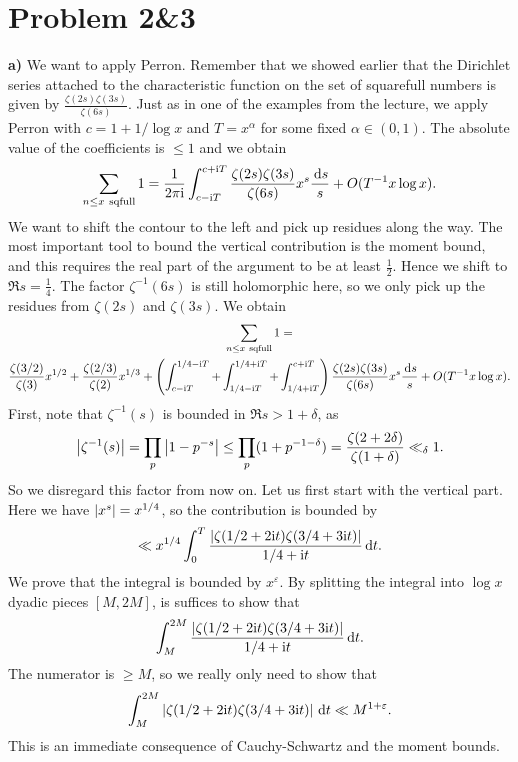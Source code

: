 \documentclass[a4paper,11pt]{article}
\begin{document}
\section*{Problem 2\&3}
\textbf{a)} We want to apply Perron. Remember that we showed earlier that
the Dirichlet series attached to the characteristic function on the set
of squarefull numbers is given by $\frac{\zeta(2s)\zeta(3s)}{\zeta(6s)}$. 
Just as in one of the examples from the lecture, we apply Perron with
$c = 1 + 1/\log x$ and $T = x^\alpha$ for some fixed $\alpha \in (0,1)$.
The absolute value of the coefficients is $\leq 1$ and we obtain
\[
    \sum_{n\leq x \  \rm sqfull} 1 
    = \frac{1}{2 \pi \mathrm i} \int_{c-\mathrm i T}^{c+\mathrm i T} \frac{\zeta(2s)\zeta(3s)}{\zeta(6s)}
    x^s \frac {\mathrm{\,d} s}s + O(T^{-1} x \log x).
\]
We want to shift the contour to the left and pick up residues along the way. 
The most important tool to bound the vertical contribution is the moment bound,
and this requires the real part of the argument to be at least $\frac 12$. 
Hence we shift to $\Re s = \frac 14$. The factor $\zeta^{-1}(6s)$ is still
holomorphic here, so we only pick up the residues from $\zeta(2s)$ and $\zeta(3s)$.
We obtain
\begin{multline*}
    \sum_{n \leq x \ \rm sqfull} 1  =  \\
    \frac{\zeta(3/2)}{\zeta(3)}x^{1/2} + \frac{\zeta(2/3)}{\zeta(2)} x^{1/3}
    + \left(\int_{c-\mathrm i T}^{1/4 - \mathrm i T} + \int_{1/4 - \mathrm i T}^{1/4 + \mathrm i T} 
    + \int_{1/4 + \mathrm i T}^{c + \mathrm i T}\right) \frac{\zeta(2s)\zeta(3s)}{\zeta(6s)}
    x^s \frac{\mathrm{\,d} s}{s} + O(T^{-1} x \log x).
\end{multline*}
First, note that $\zeta^{-1}(s)$ is bounded in $\Re s > 1+\delta$, as 
\[
    \left\lvert \zeta^{-1}(s)  \right\rvert = \prod_p \left\lvert 1-p^{-s} \right\rvert 
    \leq \prod_p (1 + p^{-1-\delta}) = \frac{\zeta(2+2\delta)}{\zeta(1+\delta)}
    \ll_\delta 1. 
\] 
So we disregard this factor from now on. Let us first start with the vertical part.
Here we have $\left\lvert x^s \right\rvert = x^{1/4}$, so the contribution is bounded by 
\[
    \ll x^{1/4} \int_0^T \frac{\left\lvert  \zeta(1/2 + 2 \mathrm i t)  \zeta(3/4 + 3 \mathrm i t) \right\rvert}
    {1/4 + \mathrm i t} \mathrm{\,d} t.
\]
We prove that the integral is bounded by $x^{\varepsilon}$. By splitting the integral
into $\log x$ dyadic pieces $[M, 2M]$, is suffices to show that 
\[
    \int_M^{2M} \frac{\left\lvert \zeta(1/2 + 2 \mathrm i t)  \zeta(3/4 + 3 \mathrm i t) \right\rvert} {1/4 +
    \mathrm i t} \mathrm{\,d} t.
\]
The numerator is $\geq M$, so we really only need to show that 
\[
    \int_M^{2M} \left\lvert \zeta(1/2 + 2 \mathrm i t)  \zeta(3/4 + 3 \mathrm i t) \right\rvert \mathrm{\,d} t \ll 
    M^{1+\varepsilon}.
\]
This is an immediate consequence of Cauchy-Schwartz and the moment bounds. 
\end{document}
